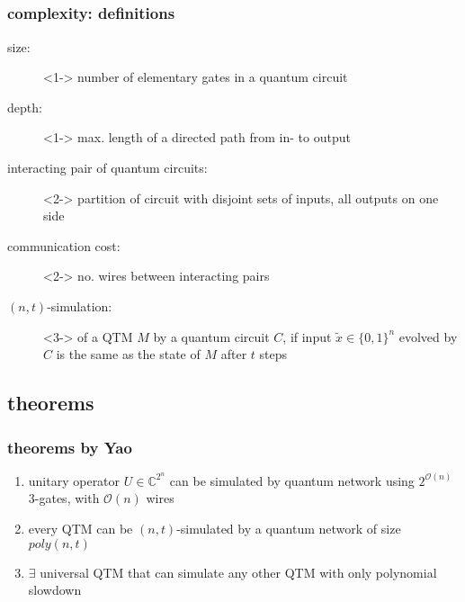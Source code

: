 \documentclass{beamer}
\begin{document}
\subsection[definitions]{}
\begin{frame}
	\frametitle{complexity: definitions}
	\begin{description}
		\item[size:]<1-> number of elementary gates in a quantum circuit
		\item[depth:]<1-> max. length of a directed path from in- to output
		\item[interacting pair of quantum circuits:]<2-> partition of circuit with disjoint sets of inputs, all outputs on one side
		\item[communication cost:]<2-> no. wires between interacting pairs
		\item[$(n,t)$-simulation:]<3-> of a QTM $M$ by a quantum circuit $C$, if input $\tilde{x}\in\{0,1\}^n$ evolved by $C$ is the same as
		the state of $M$ after $t$ steps
	\end{description}
\end{frame}
%
\subsection{theorems}
\begin{frame}
	\frametitle{theorems by Yao}
	\begin{enumerate}
		\item unitary operator $U\in\mathbb{C}^{2^n}$ can be simulated by quantum network using $2^{\mathcal{O}(n)}$ 3-gates, with $\mathcal{O}(n)$ wires
		\item every QTM can be $(n,t)$-simulated by a quantum network of size $poly(n,t)$
		\item $\exists$ universal QTM that can simulate any other QTM with only polynomial slowdown
	\end{enumerate}
\end{frame}
%
\end{document}
